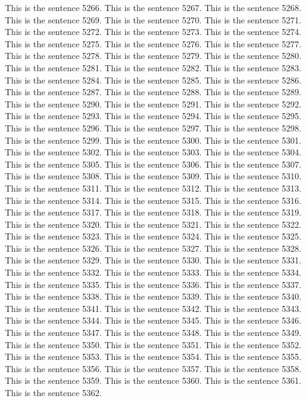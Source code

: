 \documentclass{article}
\begin{document}
This is the sentence 5266.
This is the sentence 5267.
This is the sentence 5268.
This is the sentence 5269.
This is the sentence 5270.
This is the sentence 5271.
This is the sentence 5272.
This is the sentence 5273.
This is the sentence 5274.
This is the sentence 5275.
This is the sentence 5276.
This is the sentence 5277.
This is the sentence 5278.
This is the sentence 5279.
This is the sentence 5280.
This is the sentence 5281.
This is the sentence 5282.
This is the sentence 5283.
This is the sentence 5284.
This is the sentence 5285.
This is the sentence 5286.
This is the sentence 5287.
This is the sentence 5288.
This is the sentence 5289.
This is the sentence 5290.
This is the sentence 5291.
This is the sentence 5292.
This is the sentence 5293.
This is the sentence 5294.
This is the sentence 5295.
This is the sentence 5296.
This is the sentence 5297.
This is the sentence 5298.
This is the sentence 5299.
This is the sentence 5300.
This is the sentence 5301.
This is the sentence 5302.
This is the sentence 5303.
This is the sentence 5304.
This is the sentence 5305.
This is the sentence 5306.
This is the sentence 5307.
This is the sentence 5308.
This is the sentence 5309.
This is the sentence 5310.
This is the sentence 5311.
This is the sentence 5312.
This is the sentence 5313.
This is the sentence 5314.
This is the sentence 5315.
This is the sentence 5316.
This is the sentence 5317.
This is the sentence 5318.
This is the sentence 5319.
This is the sentence 5320.
This is the sentence 5321.
This is the sentence 5322.
This is the sentence 5323.
This is the sentence 5324.
This is the sentence 5325.
This is the sentence 5326.
This is the sentence 5327.
This is the sentence 5328.
This is the sentence 5329.
This is the sentence 5330.
This is the sentence 5331.
This is the sentence 5332.
This is the sentence 5333.
This is the sentence 5334.
This is the sentence 5335.
This is the sentence 5336.
This is the sentence 5337.
This is the sentence 5338.
This is the sentence 5339.
This is the sentence 5340.
This is the sentence 5341.
This is the sentence 5342.
This is the sentence 5343.
This is the sentence 5344.
This is the sentence 5345.
This is the sentence 5346.
This is the sentence 5347.
This is the sentence 5348.
This is the sentence 5349.
This is the sentence 5350.
This is the sentence 5351.
This is the sentence 5352.
This is the sentence 5353.
This is the sentence 5354.
This is the sentence 5355.
This is the sentence 5356.
This is the sentence 5357.
This is the sentence 5358.
This is the sentence 5359.
This is the sentence 5360.
This is the sentence 5361.
This is the sentence 5362.
\end{document}
